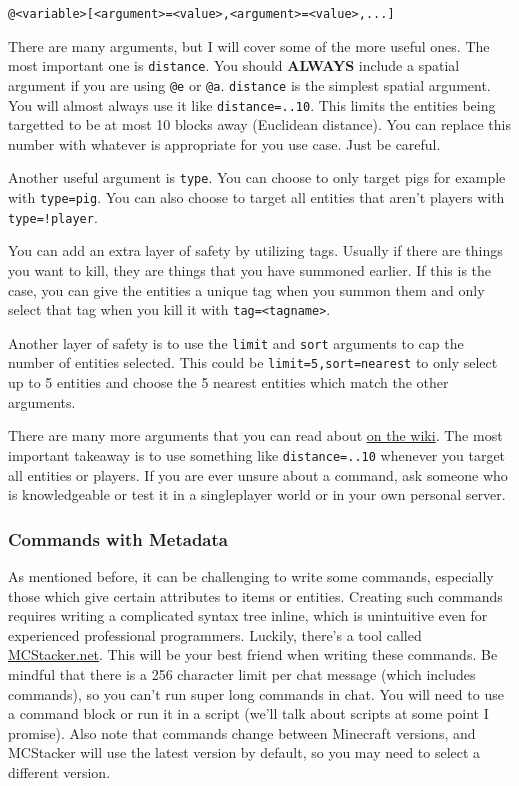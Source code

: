 \documentclass[oneside]{book}
\begin{document}
\begin{verbatim}
@<variable>[<argument>=<value>,<argument>=<value>,...]
\end{verbatim}

There are many arguments, but I will cover some of the more useful ones. The most important one is \texttt{distance}. You should \textbf{ALWAYS} include a spatial argument if you are using \texttt{@e} or \texttt{@a}. \texttt{distance} is the simplest spatial argument. You will almost always use it like \texttt{distance=..10}. This limits the entities being targetted to be at most 10 blocks away (Euclidean distance). You can replace this number with whatever is appropriate for you use case. Just be careful.

Another useful argument is \texttt{type}. You can choose to only target pigs for example with \texttt{type=pig}. You can also choose to target all entities that aren't players with \texttt{type=!player}.

You can add an extra layer of safety by utilizing tags. Usually if there are things you want to kill, they are things that you have summoned earlier. If this is the case, you can give the entities a unique tag when you summon them and only select that tag when you kill it with \texttt{tag=<tagname>}.

Another layer of safety is to use the \texttt{limit} and \texttt{sort} arguments to cap the number of entities selected. This could be \texttt{limit=5,sort=nearest} to only select up to 5 entities and choose the 5 nearest entities which match the other arguments.

There are many more arguments that you can read about \href{https://minecraft.wiki/w/Target_selectors}{on the wiki}. The most important takeaway is to use something like \texttt{distance=..10} whenever you target all entities or players. If you are ever unsure about a command, ask someone who is knowledgeable or test it in a singleplayer world or in your own personal server.

\subsubsection*{Commands with Metadata}
As mentioned before, it can be challenging to write some commands, especially those which give certain attributes to items or entities. Creating such commands requires writing a complicated syntax tree inline, which is unintuitive even for experienced professional programmers. Luckily, there's a tool called \href{https://mcstacker.net/}{MCStacker.net}. This will be your best friend when writing these commands. Be mindful that there is a 256 character limit per chat message (which includes commands), so you can't run super long commands in chat. You will need to use a command block or run it in a script (we'll talk about scripts at some point I promise). Also note that commands change between Minecraft versions, and MCStacker will use the latest version by default, so you may need to select a different version.
\end{document}
